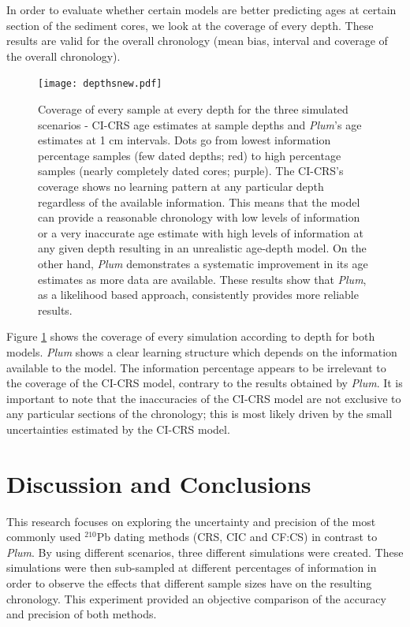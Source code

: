 \documentclass [10pt] {article}
\begin{document}
In order to evaluate whether certain models are better predicting ages at certain section of the sediment cores, we look at the coverage of every depth. 
These results are valid for the overall chronology (mean bias, interval and coverage of the overall chronology). 

\begin{figure}[!]
	\begin{centering}
		\texttt{[image: depthsnew.pdf]}
		\caption{Coverage of every sample at every depth for the three simulated scenarios - CI-CRS age estimates at sample depths and \textit{Plum}'s age estimates at 1 cm intervals. Dots go from lowest information percentage samples (few dated depths; red) to high percentage samples (nearly completely dated cores; purple). The CI-CRS's coverage shows no learning pattern at any particular depth regardless of the available information. This means that the model can provide a reasonable chronology with low levels of information or a very inaccurate age estimate with high levels of information at any given depth resulting in an unrealistic age-depth model. On the other hand, \textit{Plum} demonstrates a systematic improvement in its age estimates as more data are available. These results show that \textit{Plum}, as a likelihood based approach, consistently provides more reliable results.   }
		\label{fig:depths}
	\end{centering}
\end{figure}

Figure \ref{fig:depths} shows the coverage of every simulation according to depth for both models.
\textit{Plum} shows a clear learning structure which depends on the information available to the model.
The information percentage appears to be irrelevant to the coverage of the CI-CRS model, contrary to the results obtained by \textit{Plum}.
It is important to note that the inaccuracies of the CI-CRS model are not exclusive to any particular sections of the chronology; this is most likely driven by the small uncertainties estimated by the CI-CRS model.



\section{Discussion and Conclusions}

This research focuses on exploring the uncertainty and precision of the most commonly used $^{210}$Pb dating methods (CRS, CIC and CF:CS) in contrast to \textit{Plum}.
By using different scenarios, three different simulations were created.
These simulations were then sub-sampled at different percentages of information in order to observe the effects that different sample sizes have on the resulting chronology. 
This experiment provided an objective comparison of the accuracy and precision of both methods.
\end{document}
